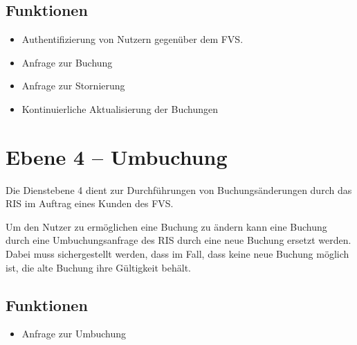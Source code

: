 \subsection*{Funktionen}
\begin{itemize}
\item Authentifizierung von Nutzern gegenüber dem FVS.
\item Anfrage zur Buchung
\item Anfrage zur Stornierung
\item Kontinuierliche Aktualisierung der Buchungen
\end{itemize}

\section{Ebene 4 -- Umbuchung}
Die Dienstebene 4 dient zur Durchführungen von Buchungsänderungen durch das RIS im Auftrag eines Kunden des FVS.

Um den Nutzer zu ermöglichen eine Buchung zu ändern kann eine Buchung durch eine Umbuchungsanfrage des RIS durch eine neue Buchung ersetzt werden. Dabei muss sichergestellt werden, dass im Fall, dass keine neue Buchung möglich ist, die alte Buchung ihre Gültigkeit behält.

\subsection*{Funktionen}
\begin{itemize}
\item Anfrage zur Umbuchung
\end{itemize}